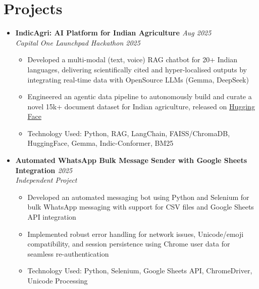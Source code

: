 \documentclass[a4paper,9pt]{article}
\newcommand{\resumeProject}[4]{
    \item\small{
        \textbf{#1} \hfill \textit{#2}\\
        \textit{#3}\\
        \begin{itemize}[leftmargin=1.5em,label=\textbullet,nosep,itemsep=0.5pt]
            #4
        \end{itemize}
    }\vspace{2pt}
}
\newcommand{\compactSection}[2]{
    \section{#1}
    \vspace{-0.1cm}
    #2
    \vspace{-0.2cm}
}
\begin{document}
\compactSection{Projects}{
\begin{itemize}[leftmargin=*,label={},itemsep=4pt]



    \resumeProject{IndicAgri: AI Platform for Indian Agriculture \href{https://github.com/Shuvam-Banerji-Seal/Answering_Agriculture}{\faGithub}}{Aug 2025}
    {Capital One Launchpad Hackathon 2025}
    {\item Developed a multi-modal (text, voice) RAG chatbot for 20+ Indian languages, delivering scientifically cited and hyper-localised outputs by integrating real-time data with OpenSource LLMs (Gemma, DeepSeek)
    \item Engineered an agentic data pipeline to autonomously build and curate a novel 15k+ document dataset for Indian agriculture, released on \href{https://huggingface.co/datasets/ShuvBan/IndicAgri}{\color{blue}Hugging Face}
    \item Technology Used: Python, RAG, LangChain, FAISS/ChromaDB, HuggingFace, Gemma, Indic-Conformer, BM25}
    
    \resumeProject{Automated WhatsApp Bulk Message Sender with Google Sheets Integration \href{https://github.com/Shuvam-Banerji-Seal/Automated-Whatsapp-Bulk-Message-Sender-using-Google-Forms-Sheets-and-Python}{\faGithub}}{2025}
    {Independent Project}
    {\item Developed an automated messaging bot using Python and Selenium for bulk WhatsApp messaging with support for CSV files and Google Sheets API integration
    \item Implemented robust error handling for network issues, Unicode/emoji compatibility, and session persistence using Chrome user data for seamless re-authentication
    \item Technology Used: Python, Selenium, Google Sheets API, ChromeDriver, Unicode Processing}
     

\end{itemize}}
\end{document}
